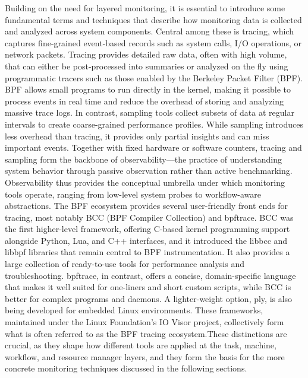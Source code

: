 Building on the need for layered monitoring, it is essential to introduce some fundamental terms and techniques that describe how monitoring data is collected and analyzed across system components. Central among these is tracing, which captures fine-grained event-based records such as system calls, I/O operations, or network packets. Tracing provides detailed raw data, often with high volume, that can either be post-processed into summaries or analyzed on the fly using programmatic tracers such as those enabled by the Berkeley Packet Filter (BPF). BPF allows small programs to run directly in the kernel, making it possible to process events in real time and reduce the overhead of storing and analyzing massive trace logs. In contrast, sampling tools collect subsets of data at regular intervals to create coarse-grained performance profiles. While sampling introduces less overhead than tracing, it provides only partial insights and can miss important events. Together with fixed hardware or software counters, tracing and sampling form the backbone of observability—the practice of understanding system behavior through passive observation rather than active benchmarking. Observability thus provides the conceptual umbrella under which monitoring tools operate, ranging from low-level system probes to workflow-aware abstractions.
The BPF ecosystem provides several user-friendly front ends for tracing, most notably BCC (BPF Compiler Collection) and bpftrace. BCC was the first higher-level framework, offering C-based kernel programming support alongside Python, Lua, and C++ interfaces, and it introduced the libbcc and libbpf libraries that remain central to BPF instrumentation. It also provides a large collection of ready-to-use tools for performance analysis and troubleshooting. bpftrace, in contrast, offers a concise, domain-specific language that makes it well suited for one-liners and short custom scripts, while BCC is better for complex programs and daemons. A lighter-weight option, ply, is also being developed for embedded Linux environments. These frameworks, maintained under the Linux Foundation’s IO Visor project, collectively form what is often referred to as the BPF tracing ecosystem.These distinctions are crucial, as they shape how different tools are applied at the task, machine, workflow, and resource manager layers, and they form the basis for the more concrete monitoring techniques discussed in the following sections.


